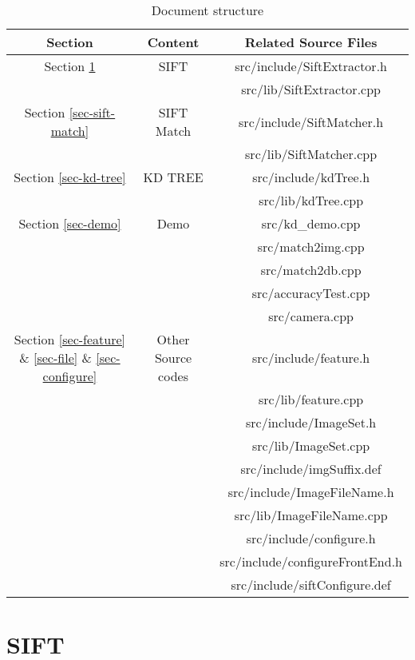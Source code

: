 \documentclass[paper=a4, fontsize=11pt]{scrartcl} %
\numberwithin{equation}{section} %
\numberwithin{figure}{section} %
\numberwithin{table}{section} %
\begin{document}
\begin{table}[h]
    \centering
    \begin{tabular}{|c|c|c|}
        \hline
        \textbf{Section} & \textbf{Content} & \textbf{Related Source Files}  \\\hline
              Section \ref{sec-sift} & SIFT & src/include/SiftExtractor.h \\
              & & src/lib/SiftExtractor.cpp \\\hline
              Section \ref{sec-sift-match} & SIFT Match & src/include/SiftMatcher.h \\
              & & src/lib/SiftMatcher.cpp \\\hline
              Section \ref{sec-kd-tree} & KD TREE& src/include/kdTree.h \\
              & & src/lib/kdTree.cpp \\\hline
              Section \ref{sec-demo} & Demo & src/kd\_demo.cpp \\
              & & src/match2img.cpp \\
              & & src/match2db.cpp \\
              & & src/accuracyTest.cpp \\
              & & src/camera.cpp \\\hline
              Section \ref{sec-feature} \& \ref{sec-file} \& \ref{sec-configure} & Other Source codes & src/include/feature.h\\
              & & src/lib/feature.cpp \\
              & & src/include/ImageSet.h\\
              & & src/lib/ImageSet.cpp\\
              & & src/include/imgSuffix.def\\
              & & src/include/ImageFileName.h\\
              & & src/lib/ImageFileName.cpp\\
              & & src/include/configure.h\\
              & & src/include/configureFrontEnd.h\\
              & & src/include/siftConfigure.def\\\hline
    \end{tabular}
    \caption{Document structure}\label{file-table}
\end{table}

\clearpage
\section{SIFT} \label{sec-sift}
\end{document}
